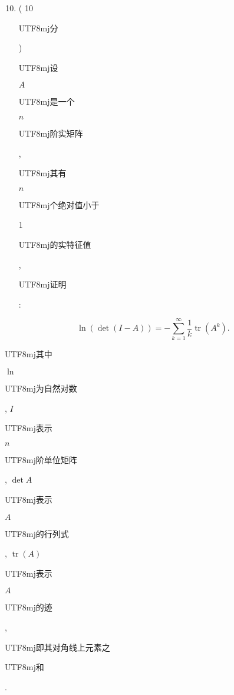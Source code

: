 \documentclass[10pt]{article}
\begin{document}
\begin{enumerate}
  \setcounter{enumi}{9}
  \item ( 10 \begin{CJK}{UTF8}{mj}分\end{CJK}) \begin{CJK}{UTF8}{mj}设\end{CJK} $A$ \begin{CJK}{UTF8}{mj}是一个\end{CJK} $n$ \begin{CJK}{UTF8}{mj}阶实矩阵\end{CJK}, \begin{CJK}{UTF8}{mj}其有\end{CJK} $n$ \begin{CJK}{UTF8}{mj}个绝对值小于\end{CJK} 1 \begin{CJK}{UTF8}{mj}的实特征值\end{CJK}, \begin{CJK}{UTF8}{mj}证明\end{CJK}:
\end{enumerate}
$$
\ln (\operatorname{det}(I-A))=-\sum_{k=1}^{\infty} \frac{1}{k} \operatorname{tr}\left(A^{k}\right) .
$$
\begin{CJK}{UTF8}{mj}其中\end{CJK} $\ln$ \begin{CJK}{UTF8}{mj}为自然对数\end{CJK}, $I$ \begin{CJK}{UTF8}{mj}表示\end{CJK} $n$ \begin{CJK}{UTF8}{mj}阶单位矩阵\end{CJK}, $\operatorname{det} A$ \begin{CJK}{UTF8}{mj}表示\end{CJK} $A$ \begin{CJK}{UTF8}{mj}的行列式\end{CJK}, $\operatorname{tr}(A)$ \begin{CJK}{UTF8}{mj}表示\end{CJK} $A$ \begin{CJK}{UTF8}{mj}的迹\end{CJK}, \begin{CJK}{UTF8}{mj}即其对角线上元素之\end{CJK} \begin{CJK}{UTF8}{mj}和\end{CJK}.
\end{document}
